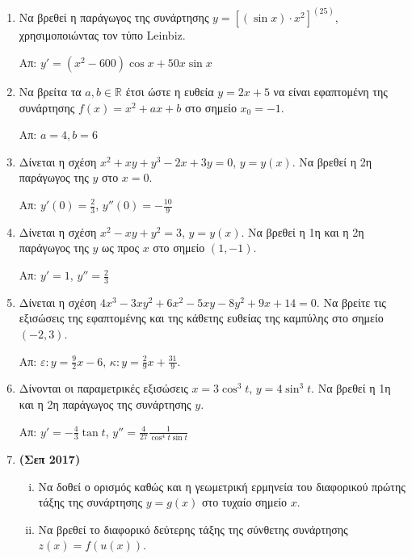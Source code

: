 \begin{enumerate}
	\item Να βρεθεί η παράγωγος της συνάρτησης $ y= \left[(\sin{x}) \cdot
		x^{2}\right]^{(25)}$, χρησιμοποιώντας τον τύπο \textlatin{Leinbiz}.

		\hfill Απ: $ y' = (x^{2} - 600) \cos{x} + 50 x \sin{x} $

	\item Να βρείτα τα $ a, b \in \mathbb{R} $ έτσι ώστε η ευθεία $ y = 2x + 5
		$ να είναι εφαπτομένη της συνάρτησης $ f(x) = x^{2} + ax + b $ στο
		σημείο $ x_{0} = -1 $. 

		\hfill Απ: $ a = 4, b = 6 $

	\item Δίνεται η σχέση $ x^{2} + xy + y^{3} -2x + 3y = 0 $, $ y=y(x) $. Να βρεθεί η
		2η παράγωγος της $y$ στο $ x=0 $. 
		
		\hfill Απ: $ y'(0) = \frac{2}{3} $, $ y''(0) = -\frac{10}{9} $ 

	\item Δίνεται η σχέση $ x^{2} - xy + y^{2} = 3 $, $ y=y(x) $. Να βρεθεί η 1η
		και η 2η παράγωγος της $y$ ως προς $x$ στο σημείο $ (1,-1) $.

		\hfill Απ: $ y' = 1$, $ y'' = \frac{2}{3} $

	\item Δίνεται η σχέση $ 4x^{3} - 3xy^{2} + 6x^{2} - 5xy - 8 y^{2} + 9x + 14
		= 0$. Να βρείτε τις εξισώσεις της εφαπτομένης και της κάθετης ευθείας
		της καμπύλης στο σημείο $ (-2,3) $.

		\hfill Απ: $\varepsilon\colon y = \frac{9}{2} x - 6 $, $\kappa\colon y = \frac{2}{9} x +
		\frac{31}{9} $.

	\item Δίνονται οι παραμετρικές εξισώσεις $ x = 3 \cos^{3}{t} $, $ y = 4
		\sin^{3}{t}	$. Να βρεθεί η 1η και η 2η παράγωγος της συνάρτησης $y$.

		\hfill Απ: $ y' = -\frac{4}{3} \tan{t} $, $ y'' = \frac{4}{27}
		\frac{1}{\cos^{4}t \sin{t}} $ 

	\item {\bfseries (Σεπ 2017)}
		\begin{enumerate}[i)]
			\item Να δοθεί ο ορισμός καθώς και η γεωμετρική
				ερμηνεία του διαφορικού πρώτης τάξης της συνάρτησης $ y = g(x) $ στο
				τυχαίο σημείο $x$. 
			\item Να βρεθεί το διαφορικό δεύτερης τάξης της σύνθετης συνάρτησης $ z(x) =
				f(u(x))	$.
		\end{enumerate}


\end{enumerate}
